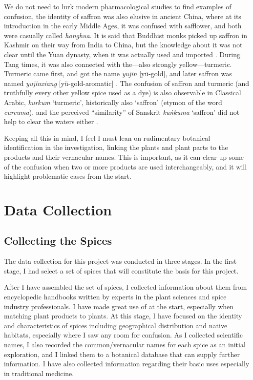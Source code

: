 We do not need to lurk modern pharmacological studies to find examples of confusion, the identity of saffron was also elusive in ancient China, where at its introduction in the early Middle Ages, it was confused with safflower, and both were casually called  \textit{honghua}. It is said that Buddhist monks picked up saffron in Kashmir on their way from India to China, but the knowledge about it was not clear until the Yuan dynasty, when it was actually used and imported \autocite{laufer_sino-iranica_1919}. During Tang times, it was also connected with the---also strongly yellow---turmeric. Turmeric came first, and got the name  \textit{yujin} [yü-gold], and later saffron was named  \textit{yujinxiang} [yü-gold-aromatic] \autocite{schafer_golden_1985}. The confusion of saffron and turmeric (and truthfully every other yellow spice used as a dye) is also observable in Classical Arabic, \textit{kurkum} `turmeric', historically also `saffron' (etymon of the word \textit{curcuma}), and the perceived ``similarity'' of Sanskrit  \textit{kuṅkuma} `saffron' did not help to clear the waters either \autocite[see]{guthrie_trade-language_2009}.

Keeping all this in mind, I feel I must lean on rudimentary botanical identification in the investigation, linking the plants and plant parts to the products and their vernacular names. This is important, as it can clear up some of the confusion when two or more products are used interchangeably, and it will highlight problematic cases from the start.

\section{Data Collection}
\label{sec:data_collection}

\subsection{Collecting the Spices}

The data collection for this project was conducted in three stages. In the first stage, I had select a set of spices that will constitute the basis for this project.

After I have assembled the set of spices, I collected information about them from encyclopedic handbooks written by experts in the plant sciences and spice industry professionals. I have made great use of \textcites{van_wyk_culinary_2014}{peter_handbook_2012}{hu_food_2005} at the start, especially when matching plant products to plants. At this stage, I have focused on the identity and characteristics of spices including geographical distribution and native habitats, especially where I saw any room for confusion. As I collected scientific names, I also recorded the common/vernacular names for 
each spice as an initial exploration, and I linked them to a botanical database that can supply further information. I have also collected information regarding their basic uses especially in traditional medicine.

